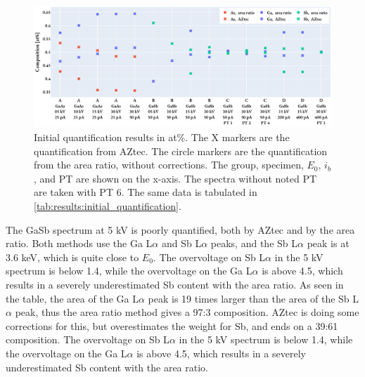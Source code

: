 



\begin{figure}[htbp]
    \centering
    \includegraphics[width=0.99\linewidth]{figures/results/initial_quantification.pdf}
    \caption{
        Initial quantification results in at\%.
        The X markers are the quantification from AZtec.
        The circle markers are the quantification from the area ratio, without corrections.
        The group, specimen, $E_0$, $i_b$, and PT are shown on the x-axis.
        The spectra without noted PT are taken with PT 6.
        The same data is tabulated in \cref{tab:results:initial_quantification}.
    }
    \label{fig:results:initial_quantification}
\end{figure}


The GaSb spectrum at 5 kV is poorly quantified, both by AZtec and by the area ratio.
Both methods use the Ga L$\alpha$ and Sb L$\alpha$ peaks, and the Sb L$\alpha$ peak is at 3.6 keV, which is quite close to $E_0$.
The overvoltage on Sb L$\alpha$ in the 5 kV spectrum is below 1.4, while the overvoltage on the Ga L$\alpha$ is above 4.5, which results in a severely underestimated Sb content with the area ratio.
As seen in the table, the area of the Ga L$\alpha$ peak is 19 times larger than the area of the Sb L$\alpha$ peak, thus the area ratio method gives a 97:3 composition.
AZtec is doing some corrections for this, but overestimates the weight for Sb, and ends on a 39:61 composition.
The overvoltage on Sb L$\alpha$ in the 5 kV spectrum is below 1.4, while the overvoltage on the Ga L$\alpha$ is above 4.5, which results in a severely underestimated Sb content with the area ratio.


